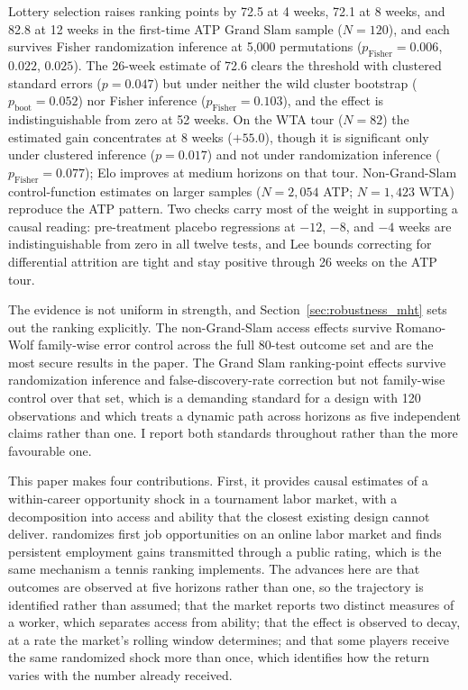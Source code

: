 Lottery selection raises ranking points by 72.5 at 4 weeks, 72.1 at 8 weeks, and 82.8 at 12 weeks in the first-time ATP Grand Slam sample ($N = 120$), and each survives Fisher randomization inference at 5{,}000 permutations ($p_{\text{Fisher}} = 0.006$, $0.022$, $0.025$). The 26-week estimate of 72.6 clears the threshold with clustered standard errors ($p = 0.047$) but under neither the wild cluster bootstrap ($p_{\text{boot}} = 0.052$) nor Fisher inference ($p_{\text{Fisher}} = 0.103$), and the effect is indistinguishable from zero at 52 weeks. On the WTA tour ($N = 82$) the estimated gain concentrates at 8 weeks ($+55.0$), though it is significant only under clustered inference ($p = 0.017$) and not under randomization inference ($p_{\text{Fisher}} = 0.077$); Elo improves at medium horizons on that tour. Non-Grand-Slam control-function estimates on larger samples ($N = 2{,}054$ ATP; $N = 1{,}423$ WTA) reproduce the ATP pattern. Two checks carry most of the weight in supporting a causal reading: pre-treatment placebo regressions at $-12$, $-8$, and $-4$ weeks are indistinguishable from zero in all twelve tests, and Lee bounds correcting for differential attrition are tight and stay positive through 26 weeks on the ATP tour.

The evidence is not uniform in strength, and Section~\ref{sec:robustness_mht} sets out the ranking explicitly. The non-Grand-Slam access effects survive Romano-Wolf family-wise error control across the full 80-test outcome set and are the most secure results in the paper. The Grand Slam ranking-point effects survive randomization inference and false-discovery-rate correction but not family-wise control over that set, which is a demanding standard for a design with 120 observations and which treats a dynamic path across horizons as five independent claims rather than one. I report both standards throughout rather than the more favourable one.

This paper makes four contributions. First, it provides causal estimates of a within-career opportunity shock in a tournament labor market, with a decomposition into access and ability that the closest existing design cannot deliver. \citet{Pallais2014_inefficient_hiring} randomizes first job opportunities on an online labor market and finds persistent employment gains transmitted through a public rating, which is the same mechanism a tennis ranking implements. The advances here are that outcomes are observed at five horizons rather than one, so the trajectory is identified rather than assumed; that the market reports two distinct measures of a worker, which separates access from ability; that the effect is observed to decay, at a rate the market's rolling window determines; and that some players receive the same randomized shock more than once, which identifies how the return varies with the number already received.

